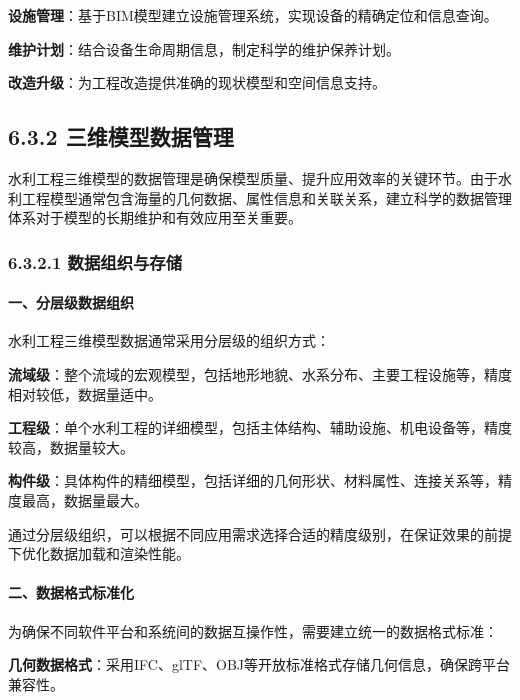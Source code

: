 \textbf{设施管理}：基于BIM模型建立设施管理系统，实现设备的精确定位和信息查询。

\textbf{维护计划}：结合设备生命周期信息，制定科学的维护保养计划。

\textbf{改造升级}：为工程改造提供准确的现状模型和空间信息支持。

\subsection{6.3.2
三维模型数据管理}\label{ux4e09ux7ef4ux6a21ux578bux6570ux636eux7ba1ux7406}

水利工程三维模型的数据管理是确保模型质量、提升应用效率的关键环节。由于水利工程模型通常包含海量的几何数据、属性信息和关联关系，建立科学的数据管理体系对于模型的长期维护和有效应用至关重要。

\subsubsection{6.3.2.1
数据组织与存储}\label{ux6570ux636eux7ec4ux7ec7ux4e0eux5b58ux50a8}

\paragraph{一、分层级数据组织}\label{ux4e00ux5206ux5c42ux7ea7ux6570ux636eux7ec4ux7ec7}

水利工程三维模型数据通常采用分层级的组织方式：

\textbf{流域级}：整个流域的宏观模型，包括地形地貌、水系分布、主要工程设施等，精度相对较低，数据量适中。

\textbf{工程级}：单个水利工程的详细模型，包括主体结构、辅助设施、机电设备等，精度较高，数据量较大。

\textbf{构件级}：具体构件的精细模型，包括详细的几何形状、材料属性、连接关系等，精度最高，数据量最大。

通过分层级组织，可以根据不同应用需求选择合适的精度级别，在保证效果的前提下优化数据加载和渲染性能。

\paragraph{二、数据格式标准化}\label{ux4e8cux6570ux636eux683cux5f0fux6807ux51c6ux5316}

为确保不同软件平台和系统间的数据互操作性，需要建立统一的数据格式标准：

\textbf{几何数据格式}：采用IFC、glTF、OBJ等开放标准格式存储几何信息，确保跨平台兼容性。

